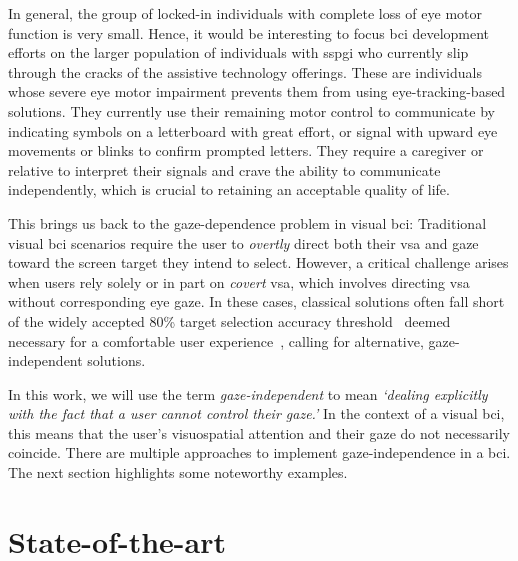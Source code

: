 In general, the group of locked-in individuals with complete loss of eye motor
function is very small.
Hence, it would be interesting to focus \ac{bci} development efforts on the
larger population of individuals with \ac{sspgi} who currently slip through
the cracks of the assistive technology offerings.
These are individuals whose severe eye motor impairment prevents them from
using eye-tracking-based solutions.
They currently use their remaining motor control to
communicate by indicating symbols on a letterboard with great effort,
or signal with upward eye movements or blinks to confirm prompted letters.
They require a caregiver or relative to interpret their signals and crave
the ability to communicate independently, which is crucial to retaining an
acceptable quality of life.

This brings us back to the gaze-dependence problem in visual \ac{bci}:
Traditional visual \ac{bci} scenarios require the user to \emph{overtly} direct both their
\ac{vsa} and gaze toward the screen target they intend to select.
However, a critical challenge arises when users rely solely or in part on
\emph{covert} \ac{vsa}, which involves directing \ac{vsa} without corresponding
eye gaze.
In these cases, classical solutions often fall short of the widely accepted
80\% target selection accuracy threshold~\cite{Brunner2010,Frenzel2011,Treder2010,RonAngevin2019}
deemed necessary for a comfortable user experience~\cite{Neeling2019}, calling for alternative, gaze-independent
solutions.

In this work, we will use the term \emph{gaze-independent} to mean
\emph{`dealing explicitly with the fact that a user cannot control their
gaze.'}
In the context of a visual \ac{bci}, this means that the user's
visuospatial attention and their gaze do not necessarily coincide.
There are multiple approaches to implement gaze-independence in a \ac{bci}.
The next section highlights some noteworthy examples.

\section{State-of-the-art}
\label{sec:gaze-independence/sota}

